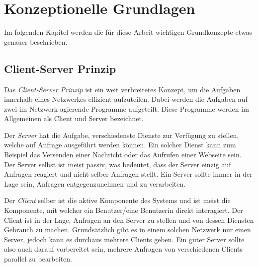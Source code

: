 \documentclass[../main.tex]{subfiles}
\begin{document}
\chapter{Konzeptionelle Grundlagen} \label{konzepte}
Im folgenden Kapitel werden die für diese Arbeit wichtigen Grundkonzepte etwas genauer beschrieben.

\section{Client-Server Prinzip} \label{ClientServerPrinzip}
Das \emph{Client-Server Prinzip} ist ein weit verbreitetes Konzept, um die Aufgaben innerhalb eines Netzwerkes effizient aufzuteilen. Dabei werden die Aufgaben auf zwei im Netzwerk agierende Programme aufgeteilt. Diese Programme werden im Allgemeinen als Client und Server bezeichnet.
	
Der \emph{Server} hat die Aufgabe, verschiedenste Dienste zur Verfügung zu stellen, welche auf Anfrage ausgeführt werden können. Ein solcher Dienst kann zum Beispiel das Versenden einer Nachricht oder das Aufrufen einer Webseite sein. Der Server selbst ist meist passiv, was bedeutet, dass der Server einzig auf Anfragen reagiert und nicht selber Anfragen stellt. Ein Server sollte immer in der Lage sein, Anfragen entgegenzunehmen und zu verarbeiten.
	
Der \emph{Client} selber ist die aktive Komponente des Systems und ist meist die Komponente, mit welcher ein Benutzer/eine Benutzerin direkt interagiert. Der Client ist in der Lage, Anfragen an den Server zu stellen und von dessen Diensten Gebrauch zu machen. Grundsätzlich gibt es in einem solchen Netzwerk nur einen Server, jedoch kann es durchaus mehrere Clients geben. Ein guter Server sollte also auch darauf vorbereitet sein, mehrere Anfragen von verschiedenen Clients parallel zu bearbeiten. \cite{fachadmin.de:ServerClient}
	
	
\end{document}
